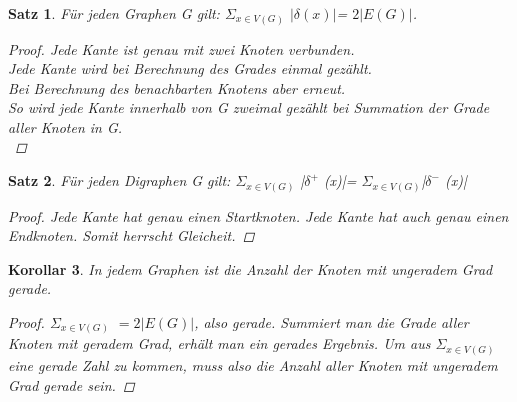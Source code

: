 \documentclass{beamer}
\newtheorem{satz}{Satz}
\newtheorem{korollar}[satz]{Korollar}
\begin{document}
  \begin{frame}
  \vfill
    \begin{center}
     \begin{satz}
        Für jeden Graphen G gilt: $\Sigma_{x\in V(G)}$ $|\delta (x)|$= $2|E(G)|$.
       \begin{proof}
          Jede Kante ist genau mit zwei Knoten verbunden.\\
          Jede Kante wird bei Berechnung des Grades einmal gezählt. \\
          Bei Berechnung des benachbarten Knotens aber erneut.\\
          So wird jede Kante innerhalb von G zweimal gezählt bei Summation der Grade aller Knoten in G.\\
        \end{proof}
      \end{satz}
    \end{center}
  \vfill
  \end{frame}

  \begin{frame}
  \vfill
    \begin{center}
      \begin{satz}
        Für jeden Digraphen G gilt: $\Sigma_{x\in V(G)}$ |$\delta^+$ (x)|= $\Sigma_{x\in V(G)}$|$\delta^-$ (x)|
        \begin{proof}
         Jede Kante hat genau einen Startknoten. Jede Kante hat auch genau einen Endknoten. Somit herrscht Gleicheit.
        \end{proof}
      \end{satz}
    \end{center}
  \vfill
  \end{frame}

  \begin{frame}
  \vfill
    \begin{center}
      \begin{korollar}
        In jedem Graphen ist die Anzahl der Knoten  mit ungeradem Grad gerade.
        \begin{proof}
          $\Sigma_{x\in V(G)}$ $= 2|E(G)|$, also gerade.
          Summiert man die Grade aller Knoten mit geradem Grad, erhält man ein gerades Ergebnis.
          Um aus $\Sigma_{x\in V(G)}$ eine gerade Zahl zu kommen, muss also die Anzahl aller Knoten mit ungeradem Grad gerade sein.
        \end{proof}
      \end{korollar}
    \end{center}
  \vfill
  \end{frame}
\end{document}
